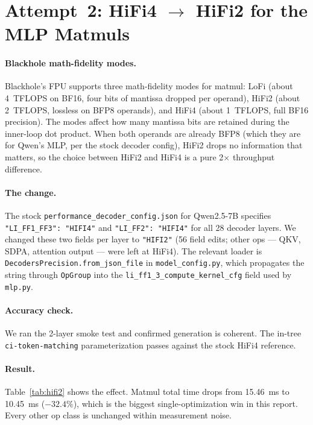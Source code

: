 \documentclass[sigplan,nonacm]{acmart}
\newcommand{\code}[1]{\texttt{\nolinkurl{#1}}}
\begin{document}
\section{Attempt~2: HiFi4 $\to$ HiFi2 for the MLP Matmuls}
\label{sec:hifi2}

\paragraph{Blackhole math-fidelity modes.} Blackhole's FPU supports
three math-fidelity modes for matmul: LoFi (about 4~TFLOPS on BF16,
four bits of mantissa dropped per operand), HiFi2 (about 2~TFLOPS,
lossless on BFP8 operands), and HiFi4 (about 1~TFLOPS, full BF16
precision). The modes affect how many mantissa bits are retained during
the inner-loop dot product. When both operands are already BFP8 (which
they are for Qwen's MLP, per the stock decoder config), HiFi2 drops
no information that matters, so the choice between HiFi2 and HiFi4 is
a pure 2$\times$ throughput difference.

\paragraph{The change.} The stock
\texttt{performance\_decoder\_config.json} for Qwen2.5-7B specifies
\texttt{"LI\_FF1\_FF3": "HIFI4"} and \texttt{"LI\_FF2": "HIFI4"}
for all 28 decoder layers. We changed these two fields per layer to
\texttt{"HIFI2"} (56 field edits; other ops --- QKV, SDPA,
attention output --- were left at HiFi4). The relevant loader is
\code{DecodersPrecision.from_json_file} in \texttt{model\_config.py},
which propagates the string through \texttt{OpGroup} into the
\code{li_ff1_3_compute_kernel_cfg} field used by \texttt{mlp.py}.

\paragraph{Accuracy check.} We ran the 2-layer smoke test and
confirmed generation is coherent. The in-tree
\texttt{ci-token-matching} parameterization passes against the stock
HiFi4 reference.

\paragraph{Result.}
Table~\ref{tab:hifi2} shows the effect. Matmul total time drops from
15.46~ms to 10.45~ms (${-}32.4\%$), which is the biggest
single-optimization win in this report. Every other op class is
unchanged within measurement noise.
\end{document}
